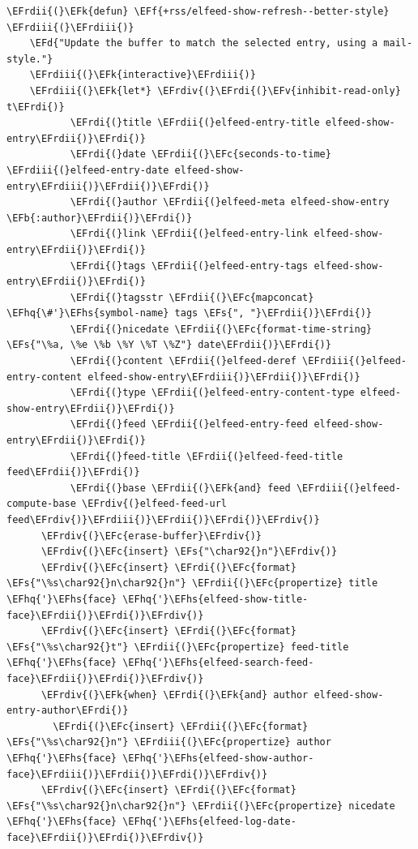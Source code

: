 \documentclass{scrartcl}
\newcommand{\EFk}[1]{\textcolor{EFk}{#1}} %
\newcommand{\EFd}[1]{\textcolor{EFd}{#1}} %
\newcommand{\EFs}[1]{\textcolor{EFs}{#1}} %
\newcommand{\EFb}[1]{\textcolor{EFb}{#1}} %
\newcommand{\EFc}[1]{\textcolor{EFc}{#1}} %
\newcommand{\EFv}[1]{\textcolor{EFv}{#1}} %
\newcommand{\EFf}[1]{\textcolor{EFf}{#1}} %
\newcommand{\EFhq}[1]{#1} %
\newcommand{\EFhs}[1]{#1} %
\newcommand{\EFrdi}[1]{#1} %
\newcommand{\EFrdii}[1]{#1} %
\newcommand{\EFrdiii}[1]{#1} %
\newcommand{\EFrdiv}[1]{#1} %
\begin{document}
\begin{Code}
\begin{Verbatim}[]
  \EFrdii{(}\EFk{defun} \EFf{+rss/elfeed-show-refresh--better-style} \EFrdiii{(}\EFrdiii{)}
    \EFd{"Update the buffer to match the selected entry, using a mail-style."}
    \EFrdiii{(}\EFk{interactive}\EFrdiii{)}
    \EFrdiii{(}\EFk{let*} \EFrdiv{(}\EFrdi{(}\EFv{inhibit-read-only} t\EFrdi{)}
           \EFrdi{(}title \EFrdii{(}elfeed-entry-title elfeed-show-entry\EFrdii{)}\EFrdi{)}
           \EFrdi{(}date \EFrdii{(}\EFc{seconds-to-time} \EFrdiii{(}elfeed-entry-date elfeed-show-entry\EFrdiii{)}\EFrdii{)}\EFrdi{)}
           \EFrdi{(}author \EFrdii{(}elfeed-meta elfeed-show-entry \EFb{:author}\EFrdii{)}\EFrdi{)}
           \EFrdi{(}link \EFrdii{(}elfeed-entry-link elfeed-show-entry\EFrdii{)}\EFrdi{)}
           \EFrdi{(}tags \EFrdii{(}elfeed-entry-tags elfeed-show-entry\EFrdii{)}\EFrdi{)}
           \EFrdi{(}tagsstr \EFrdii{(}\EFc{mapconcat} \EFhq{\#'}\EFhs{symbol-name} tags \EFs{", "}\EFrdii{)}\EFrdi{)}
           \EFrdi{(}nicedate \EFrdii{(}\EFc{format-time-string} \EFs{"\%a, \%e \%b \%Y \%T \%Z"} date\EFrdii{)}\EFrdi{)}
           \EFrdi{(}content \EFrdii{(}elfeed-deref \EFrdiii{(}elfeed-entry-content elfeed-show-entry\EFrdiii{)}\EFrdii{)}\EFrdi{)}
           \EFrdi{(}type \EFrdii{(}elfeed-entry-content-type elfeed-show-entry\EFrdii{)}\EFrdi{)}
           \EFrdi{(}feed \EFrdii{(}elfeed-entry-feed elfeed-show-entry\EFrdii{)}\EFrdi{)}
           \EFrdi{(}feed-title \EFrdii{(}elfeed-feed-title feed\EFrdii{)}\EFrdi{)}
           \EFrdi{(}base \EFrdii{(}\EFk{and} feed \EFrdiii{(}elfeed-compute-base \EFrdiv{(}elfeed-feed-url feed\EFrdiv{)}\EFrdiii{)}\EFrdii{)}\EFrdi{)}\EFrdiv{)}
      \EFrdiv{(}\EFc{erase-buffer}\EFrdiv{)}
      \EFrdiv{(}\EFc{insert} \EFs{"\char92{}n"}\EFrdiv{)}
      \EFrdiv{(}\EFc{insert} \EFrdi{(}\EFc{format} \EFs{"\%s\char92{}n\char92{}n"} \EFrdii{(}\EFc{propertize} title \EFhq{'}\EFhs{face} \EFhq{'}\EFhs{elfeed-show-title-face}\EFrdii{)}\EFrdi{)}\EFrdiv{)}
      \EFrdiv{(}\EFc{insert} \EFrdi{(}\EFc{format} \EFs{"\%s\char92{}t"} \EFrdii{(}\EFc{propertize} feed-title \EFhq{'}\EFhs{face} \EFhq{'}\EFhs{elfeed-search-feed-face}\EFrdii{)}\EFrdi{)}\EFrdiv{)}
      \EFrdiv{(}\EFk{when} \EFrdi{(}\EFk{and} author elfeed-show-entry-author\EFrdi{)}
        \EFrdi{(}\EFc{insert} \EFrdii{(}\EFc{format} \EFs{"\%s\char92{}n"} \EFrdiii{(}\EFc{propertize} author \EFhq{'}\EFhs{face} \EFhq{'}\EFhs{elfeed-show-author-face}\EFrdiii{)}\EFrdii{)}\EFrdi{)}\EFrdiv{)}
      \EFrdiv{(}\EFc{insert} \EFrdi{(}\EFc{format} \EFs{"\%s\char92{}n\char92{}n"} \EFrdii{(}\EFc{propertize} nicedate \EFhq{'}\EFhs{face} \EFhq{'}\EFhs{elfeed-log-date-face}\EFrdii{)}\EFrdi{)}\EFrdiv{)}

\end{Verbatim}
\end{Code}
\end{document}
